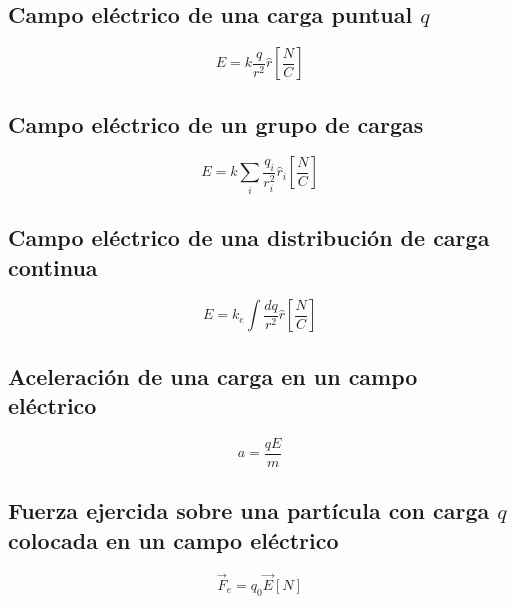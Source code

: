 \documentclass{report}
\begin{document}
    \subsection*{Campo eléctrico de una carga puntual $q$}
      \begin{equation*}
        E=k\frac{q}{r^2}\hat{r}\left[\frac{N}{C}\right]
      \end{equation*}

    \subsection*{Campo eléctrico de un grupo de cargas}
      \begin{equation*}
        E=k\sum_{i}\frac{q_i}{r_i^2}\hat{r}_i\left[\frac{N}{C}\right]
      \end{equation*}

    \subsection*{Campo eléctrico de una distribución de carga continua}
      \begin{equation*}
        E=k_e\int\frac{dq}{r^2}\hat{r}\left[\frac{N}{C}\right]
      \end{equation*}

    \subsection*{Aceleración de una carga en un campo eléctrico}
      \begin{equation*}
        a=\frac{qE}{m}
      \end{equation*}

    \subsection*{Fuerza ejercida sobre una partícula con carga $q$ colocada en un campo eléctrico}
      \begin{equation*}
        \overrightarrow{F}_e=q_0\overrightarrow{E}[N]
      \end{equation*}
\end{document}
